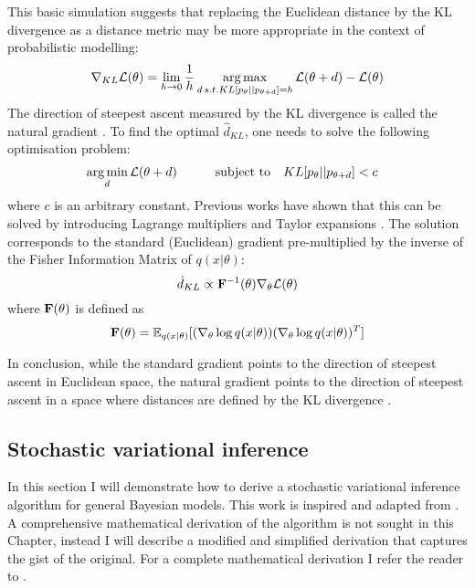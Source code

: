 This basic simulation suggests that replacing the Euclidean distance by the KL divergence as a distance metric may be more appropriate in the context of probabilistic modelling:
\[
	\nabla_{KL} \mathcal{L}(\theta) = \lim_{h\to0} \frac{1}{h}\operatorname*{arg\,max}_{d \, s.t. KL[p_\theta||p_{\theta+d}]=h} \mathcal{L}(\theta+d) - \mathcal{L}(\theta)
\]
The direction of steepest ascent measured by the KL divergence is called the natural gradient \cite{Amari1998,Martens2014}. To find the optimal $\hat{d}_{KL}$, one needs to solve the following optimisation problem:
\begin{equation*} \begin{aligned}
	&\operatorname*{arg\,min}_{d} \mathcal{L}(\theta+d) \qquad
	& \text{subject to}
	& \quad KL[p_\theta||p_{\theta+d}] < c
\end{aligned} \end{equation*}
where $c$ is an arbitrary constant. Previous works have shown that this can be solved by introducing Lagrange multipliers and Taylor expansions \cite{Amari1998,Kristiadi2019}. The solution corresponds to the standard (Euclidean) gradient pre-multiplied by the inverse of the Fisher Information Matrix of $q(x|\theta)$:
\begin{equation}\label{natural_gradient}
	\hat{d}_{KL} \propto {\bf F}^{-1}(\theta) \nabla_{\theta} \mathcal{L}(\theta)
\end{equation}
where ${\bf F}(\theta)$ is defined as
\[
	{\bf F}(\theta) = \mathbb{E}_{q(x|\theta)}[(\nabla_\theta \log q(x|\theta)) (\nabla_\theta \log q(x|\theta))^T]
\]


In conclusion, while the standard gradient points to the direction of steepest ascent in Euclidean space, the natural gradient points to the direction of steepest ascent in a space where distances are defined by the KL divergence \cite{Kristiadi2019,Amari1998,Hoffman2012}.


\subsection{Stochastic variational inference} \label{section:stochastic_variational_inference}

In this section I will demonstrate how to derive a stochastic variational inference algorithm for general Bayesian models. This work is inspired and adapted from \cite{Hoffman2012}. A comprehensive mathematical derivation of the algorithm is not sought in this Chapter, instead I will describe a modified and simplified derivation that captures the gist of the original. For a complete mathematical derivation I refer the reader to \cite{Hoffman2012}.

